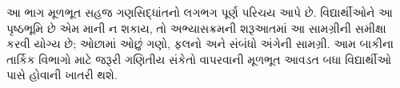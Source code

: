 \documentclass[../../include/open-logic-part]{subfiles}
\begin{document}

\begin{editorial}
  આ ભાગ મૂળભૂત સહજ ગણસિદ્ધાંતનો લગભગ પૂર્ણ પરિચય આપે છે.
  વિદ્યાર્થીઓને આ પૃષ્ઠભૂમિ છે એમ માની ન શકાય,
  તો અભ્યાસક્રમની શરૂઆતમાં આ સામગ્રીની સમીક્ષા કરવી યોગ્ય છે;
  ઓછામાં ઓછું ગણો, ફલનો અને સંબંધો અંગેની સામગ્રી.
  આમ બાકીના તાર્કિક વિભાગો માટે જરૂરી ગણિતીય સંકેતો વાપરવાની
  મૂળભૂત આવડત બધા વિદ્યાર્થીઓ પાસે હોવાની ખાતરી થશે.
\end{editorial}





\OLEndPartHook
\end{document}
